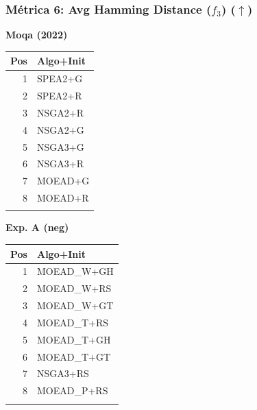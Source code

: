 \documentclass[a4paper,10pt]{article}
\begin{document}
\subsubsection{Métrica 6: Avg Hamming Distance (\texorpdfstring{$f_3$}{f3}) \texorpdfstring{($\uparrow$)}{(up)}}
\begin{table}[H]
    \centering
    \begin{minipage}[t]{0.32\textwidth}
        \centering\scriptsize\textbf{Moqa (2022)}\\
        \begin{tabular}{rl}
            \toprule
            Pos & Algo+Init \\ \midrule
            1 & SPEA2+G \\
            2 & SPEA2+R \\
            3 & NSGA2+R \\
            4 & NSGA2+G \\
            5 & NSGA3+G \\
            6 & NSGA3+R \\
            7 & MOEAD+G \\
            8 & MOEAD+R \\
            \\
            \bottomrule
        \end{tabular}
    \end{minipage}
    \hfill
    \begin{minipage}[t]{0.32\textwidth}
        \centering\scriptsize\textbf{Exp. A (neg)}\\
        \begin{tabular}{rl}
            \toprule
            Pos & Algo+Init \\ \midrule
            1 & MOEAD\_W+GH \\
            2 & MOEAD\_W+RS \\
            3 & MOEAD\_W+GT \\
            4 & MOEAD\_T+RS \\
            5 & MOEAD\_T+GH \\
            6 & MOEAD\_T+GT \\
            7 & NSGA3+RS \\
            8 & MOEAD\_P+RS \\
            \\
            \bottomrule
        \end{tabular}
    \end{minipage}
    \hfill
    \begin{minipage}[t]{0.32\textwidth}

\end{minipage}
\end{table}
\end{document}
